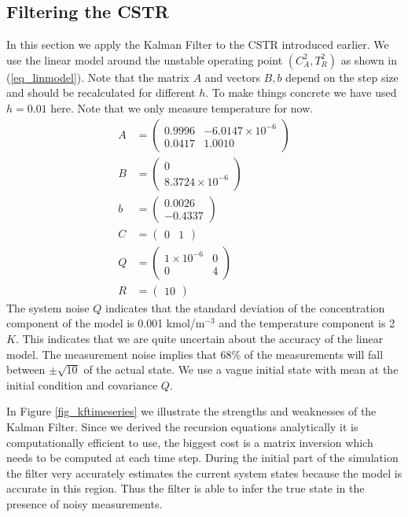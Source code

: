 \documentclass[../masters.tex]{subfiles}
\begin{document}
\subsection{Filtering the CSTR}
In this section we apply the Kalman Filter to the CSTR introduced earlier. We use the linear model around the unstable operating point $(C_A^2, T_R^2)$ as shown in (\ref{eq_linmodel}). Note that the matrix $A$ and vectors $B, b$ depend on the step size and should be recalculated for different $h$. To make things concrete we have used $h=0.01$ here. Note that we only measure temperature for now.
\begin{equation}
\begin{aligned}
A &= \begin{pmatrix}
0.9996 & -6.0147\times 10^{-6} \\
0.0417 & 1.0010
\end{pmatrix} \\
B &= \begin{pmatrix}
0 \\ 8.3724\times 10^{-6}
\end{pmatrix} \\
b &= \begin{pmatrix}
0.0026 \\ -0.4337
\end{pmatrix} \\
C &= \begin{pmatrix}
0 & 1
\end{pmatrix} \\
Q &= \begin{pmatrix}
1\times 10^{-6} & 0 \\ 0 & 4
\end{pmatrix} \\
R &= \begin{pmatrix}
10
\end{pmatrix}
\end{aligned}
\label{eq_linmodel}
\end{equation}
The system noise $Q$ indicates that the standard deviation of the concentration component of the model is 0.001 kmol/m$^{-3}$ and the temperature component is 2 $K$. This indicates that we are quite uncertain about the accuracy of the linear model. The measurement noise implies that 68\% of the measurements will fall between $\pm\sqrt{10}$ of the actual state. We use a vague initial state with mean at the initial condition and covariance $Q$.

In Figure \ref{fig_kftimeseries} we illustrate the strengths and weaknesses of the Kalman Filter. Since we derived the recursion equations analytically it is computationally efficient to use, the biggest cost is a matrix inversion which needs to be computed at each time step. During the initial part of the simulation the filter very accurately estimates the current system states because the model is accurate in this region. Thus the filter is able to infer the true state in the presence of noisy measurements. 
\end{document}
